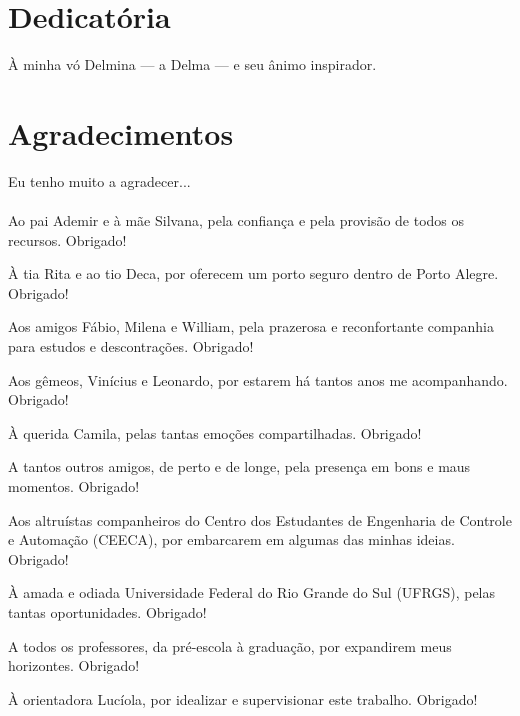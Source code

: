\documentclass[repeatfields,oneside,overleaf]{tcc}
\begin{document}
\maketitle


\chapter*{Dedicatória}

À minha vó Delmina --- a Delma --- e seu ânimo inspirador.

\chapter*{Agradecimentos}

Eu tenho muito a agradecer...
\\\\

Ao pai Ademir e à mãe Silvana, pela confiança e pela provisão de todos os recursos. Obrigado!

À tia Rita e ao tio Deca, por oferecem um porto seguro dentro de Porto Alegre. Obrigado!


Aos amigos Fábio, Milena e William, pela prazerosa e reconfortante companhia para estudos e descontrações. Obrigado!

Aos gêmeos, Vinícius e Leonardo, por estarem há tantos anos me acompanhando. Obrigado!

À querida Camila, pelas tantas emoções compartilhadas. Obrigado!

A tantos outros amigos, de perto e de longe, pela presença em bons e maus momentos. Obrigado!

Aos altruístas companheiros do Centro dos Estudantes de Engenharia de Controle e Automação (CEECA), por embarcarem em algumas das minhas ideias. Obrigado!

À amada e odiada Universidade Federal do Rio Grande do Sul (UFRGS), pelas tantas oportunidades. Obrigado!

A todos os professores, da pré-escola à graduação, por expandirem meus horizontes. Obrigado!

À orientadora Lucíola, por idealizar e supervisionar este trabalho. Obrigado!
\end{document}
